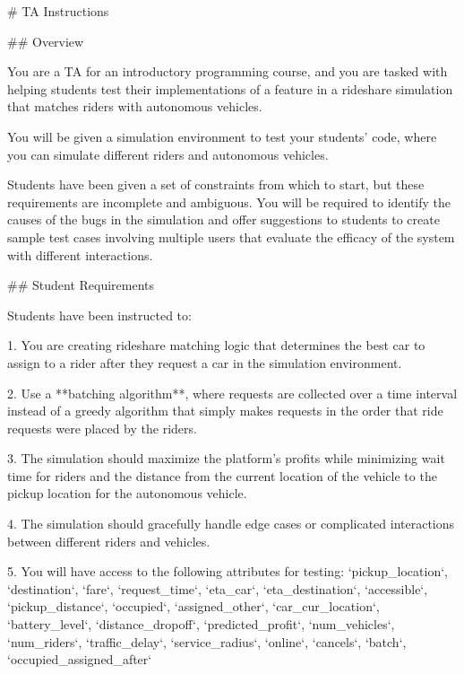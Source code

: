 # TA Instructions

## Overview

You are a TA for an introductory programming course, and you are tasked with helping students test their implementations of a feature in a rideshare simulation that matches riders with autonomous vehicles.

You will be given a simulation environment to test your students' code, where you can simulate different riders and autonomous vehicles.

Students have been given a set of constraints from which to start, but these requirements are incomplete and ambiguous. You will be required to identify the causes of the bugs in the simulation and offer suggestions to students to create sample test cases involving multiple users that evaluate the efficacy of the system with different interactions.

## Student Requirements

Students have been instructed to:

1. You are creating rideshare matching logic that determines the best car to assign to a rider after they request a car in the simulation environment.

2. Use a **batching algorithm**, where requests are collected over a time interval instead of a greedy algorithm that simply makes requests in the order that ride requests were placed by the riders.

3. The simulation should maximize the platform's profits while minimizing wait time for riders and the distance from the current location of the vehicle to the pickup location for the autonomous vehicle.

4. The simulation should gracefully handle edge cases or complicated interactions between different riders and vehicles.

5. You will have access to the following attributes for testing:
`pickup_location`, `destination`, `fare`, `request_time`, `eta_car`, `eta_destination`, `accessible`, `pickup_distance`, `occupied`, `assigned_other`, `car_cur_location`, `battery_level`, `distance_dropoff`, `predicted_profit`, `num_vehicles`, `num_riders`, `traffic_delay`, `service_radius`, `online`, `cancels`, `batch`, `occupied_assigned_after`